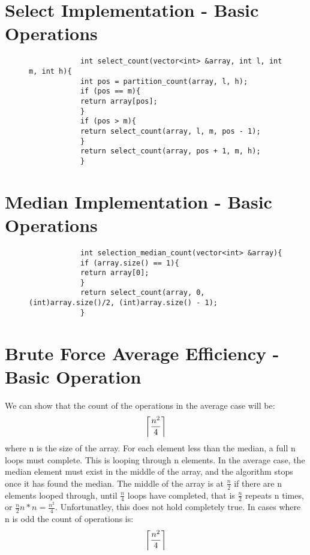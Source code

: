 \documentclass[a4paper,12pt]{article} %
\DeclarePairedDelimiter\ceil{\lceil}{\rceil} %
\begin{document}
\begin{appendices}
		\section{Select Implementation - Basic Operations}
		\begin{figure}[H]
			\begin{lstlisting}
			int select_count(vector<int> &array, int l, int m, int h){
			int pos = partition_count(array, l, h);
			if (pos == m){
			return array[pos];
			}
			if (pos > m){
			return select_count(array, l, m, pos - 1);
			}
			return select_count(array, pos + 1, m, h);
			}
			\end{lstlisting}
			\caption{\label{SelectImplemenationOps} }
		\end{figure}
		\newpage
		
		\section{Median Implementation - Basic Operations}
		\begin{figure}[H]
			\begin{lstlisting}
			int selection_median_count(vector<int> &array){
			if (array.size() == 1){
			return array[0];
			}
			return select_count(array, 0, (int)array.size()/2, (int)array.size() - 1);
			}
			\end{lstlisting}
			\caption{\label{MedianImplementationOps} }
		\end{figure}
		
		\newpage
		
		\section{Brute Force Average Efficiency - Basic Operation}
		\label{bruteops}
		We can show that the count of the operations in the average case will be:
		\begin{equation*}
		\ceil*{\frac{n^2}{4}}
		\end{equation*}
		where n is the size of the array.
		For each element less than the median, a full n loops must complete. This is looping through n elements. In the average case, the median element must exist in the middle of the array, and the algorithm stops once it has found the median. 
		The middle of the array is at $\frac{n}{2}$  if there are n elements looped through, until $\frac{n}{4}$ loops have completed, that is $\frac{n}{2}$ repeats n times, or $\frac{n}{2} n * n = {\frac{n^2}{4}} $. Unfortunatley, this does not hold completely true. In cases where n is odd the count of operations is:
		\begin{equation*}
		\ceil*{\frac{n^2}{4}}
		\end{equation*}
		
	\end{appendices}
\end{document}
